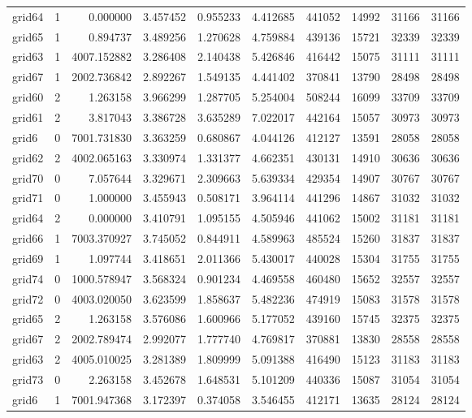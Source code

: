 \begin{longtable}{|l|r|r|r|r|r|r|r|r|r|}
grid64 & 1 & 0.000000 & 3.457452 & 0.955233 & 4.412685 & 441052 & 14992 & 31166 & 31166 \\
grid65 & 1 & 0.894737 & 3.489256 & 1.270628 & 4.759884 & 439136 & 15721 & 32339 & 32339 \\
grid63 & 1 & 4007.152882 & 3.286408 & 2.140438 & 5.426846 & 416442 & 15075 & 31111 & 31111 \\
grid67 & 1 & 2002.736842 & 2.892267 & 1.549135 & 4.441402 & 370841 & 13790 & 28498 & 28498 \\
grid60 & 2 & 1.263158 & 3.966299 & 1.287705 & 5.254004 & 508244 & 16099 & 33709 & 33709 \\
grid61 & 2 & 3.817043 & 3.386728 & 3.635289 & 7.022017 & 442164 & 15057 & 30973 & 30973 \\
grid6 & 0 & 7001.731830 & 3.363259 & 0.680867 & 4.044126 & 412127 & 13591 & 28058 & 28058 \\
grid62 & 2 & 4002.065163 & 3.330974 & 1.331377 & 4.662351 & 430131 & 14910 & 30636 & 30636 \\
grid70 & 0 & 7.057644 & 3.329671 & 2.309663 & 5.639334 & 429354 & 14907 & 30767 & 30767 \\
grid71 & 0 & 1.000000 & 3.455943 & 0.508171 & 3.964114 & 441296 & 14867 & 31032 & 31032 \\
grid64 & 2 & 0.000000 & 3.410791 & 1.095155 & 4.505946 & 441062 & 15002 & 31181 & 31181 \\
grid66 & 1 & 7003.370927 & 3.745052 & 0.844911 & 4.589963 & 485524 & 15260 & 31837 & 31837 \\
grid69 & 1 & 1.097744 & 3.418651 & 2.011366 & 5.430017 & 440028 & 15304 & 31755 & 31755 \\
grid74 & 0 & 1000.578947 & 3.568324 & 0.901234 & 4.469558 & 460480 & 15652 & 32557 & 32557 \\
grid72 & 0 & 4003.020050 & 3.623599 & 1.858637 & 5.482236 & 474919 & 15083 & 31578 & 31578 \\
grid65 & 2 & 1.263158 & 3.576086 & 1.600966 & 5.177052 & 439160 & 15745 & 32375 & 32375 \\
grid67 & 2 & 2002.789474 & 2.992077 & 1.777740 & 4.769817 & 370881 & 13830 & 28558 & 28558 \\
grid63 & 2 & 4005.010025 & 3.281389 & 1.809999 & 5.091388 & 416490 & 15123 & 31183 & 31183 \\
grid73 & 0 & 2.263158 & 3.452678 & 1.648531 & 5.101209 & 440336 & 15087 & 31054 & 31054 \\
grid6 & 1 & 7001.947368 & 3.172397 & 0.374058 & 3.546455 & 412171 & 13635 & 28124 & 28124 \\

\end{longtable}
